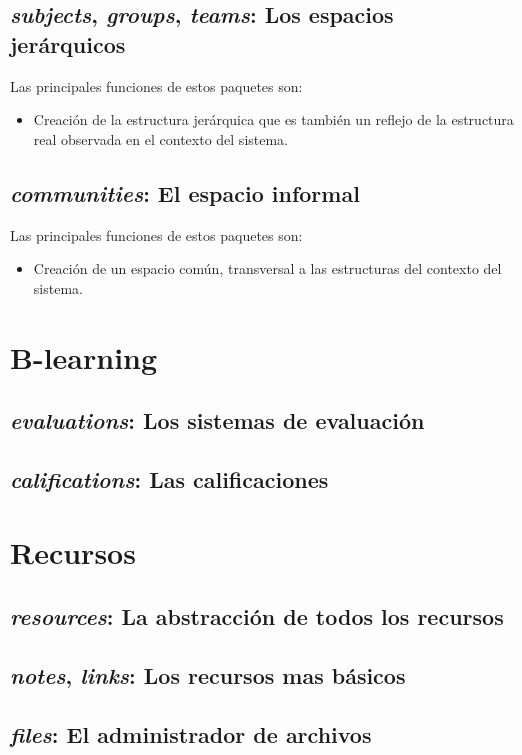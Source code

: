 \subsection{\emph{subjects}, \emph{groups}, \emph{teams}: Los espacios
jerárquicos}
Las principales funciones de estos paquetes son:
\begin{itemize}
\item Creación de la estructura jerárquica que es también un reflejo de la
estructura real observada en el contexto del sistema.
\end{itemize}

\subsection{\emph{communities}: El espacio informal}
Las principales funciones de estos paquetes son:
\begin{itemize}
\item Creación de un espacio común, transversal a las estructuras del contexto
del sistema.
\end{itemize}

\section{B-learning}
\subsection{\emph{evaluations}: Los sistemas de evaluación}
\subsection{\emph{califications}: Las calificaciones}

\section{Recursos}
\subsection{\emph{resources}: La abstracción de todos los recursos}
\subsection{\emph{notes}, \emph{links}: Los recursos mas básicos}
\subsection{\emph{files}: El administrador de archivos}
